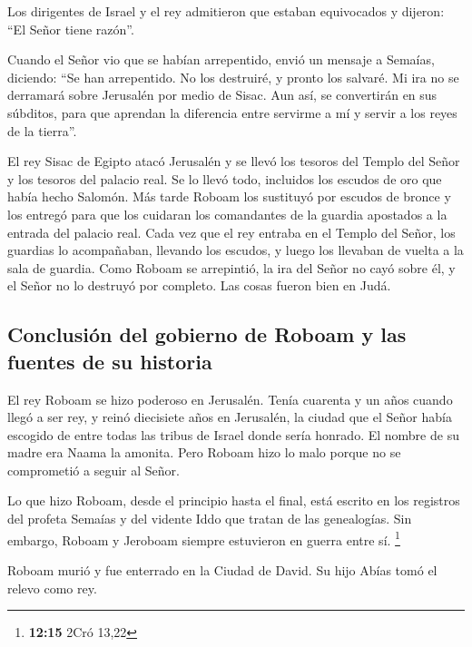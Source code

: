  Los dirigentes de Israel y el rey admitieron que estaban
equivocados y dijeron: ``El Señor tiene razón''.

 Cuando el Señor vio que se habían arrepentido, envió un
mensaje a Semaías, diciendo: ``Se han arrepentido. No los destruiré, y
pronto los salvaré. Mi ira no se derramará sobre Jerusalén por medio de
Sisac.  Aun así, se convertirán en sus súbditos, para que
aprendan la diferencia entre servirme a mí y servir a los reyes de la
tierra''.

 El rey Sisac de Egipto atacó Jerusalén y se llevó los
tesoros del Templo del Señor y los tesoros del palacio real. Se lo llevó
todo, incluidos los escudos de oro que había hecho Salomón.
 Más tarde Roboam los sustituyó por escudos de bronce y
los entregó para que los cuidaran los comandantes de la guardia
apostados a la entrada del palacio real.  Cada vez que el
rey entraba en el Templo del Señor, los guardias lo acompañaban,
llevando los escudos, y luego los llevaban de vuelta a la sala de
guardia.  Como Roboam se arrepintió, la ira del Señor no
cayó sobre él, y el Señor no lo destruyó por completo. Las cosas fueron
bien en Judá.

\hypertarget{conclusiuxf3n-del-gobierno-de-roboam-y-las-fuentes-de-su-historia}{%
\subsection{Conclusión del gobierno de Roboam y las fuentes de su
historia}\label{conclusiuxf3n-del-gobierno-de-roboam-y-las-fuentes-de-su-historia}}

 El rey Roboam se hizo poderoso en Jerusalén. Tenía
cuarenta y un años cuando llegó a ser rey, y reinó diecisiete años en
Jerusalén, la ciudad que el Señor había escogido de entre todas las
tribus de Israel donde sería honrado. El nombre de su madre era Naama la
amonita.  Pero Roboam hizo lo malo porque no se
comprometió a seguir al Señor.

 Lo que hizo Roboam, desde el principio hasta el final,
está escrito en los registros del profeta Semaías y del vidente Iddo que
tratan de las genealogías. Sin embargo, Roboam y Jeroboam siempre
estuvieron en guerra entre sí. \footnote{\textbf{12:15} 2Cró 13,22}

 Roboam murió y fue enterrado en la Ciudad de David. Su
hijo Abías tomó el relevo como rey.


